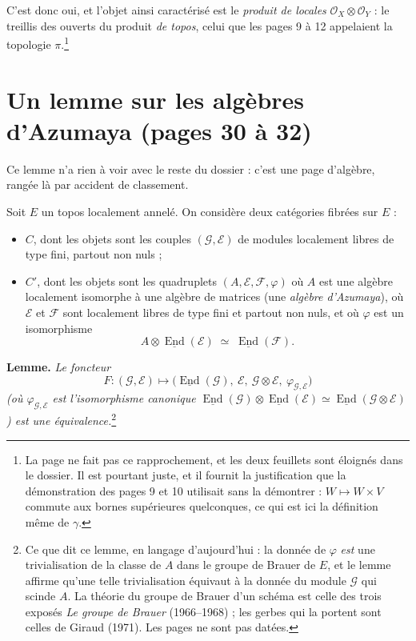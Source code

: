 \documentclass[11pt,a4paper]{article}
\begin{document}
C'est donc oui, et l'objet ainsi caractérisé est le \emph{produit de
locales} $\mathcal{O}_{X} \otimes \mathcal{O}_{Y}$ : le treillis des ouverts du
produit \emph{de topos}, celui que les pages 9 à 12 appelaient la topologie
$\pi$.\footnote{La page ne fait pas ce rapprochement, et les deux feuillets
sont éloignés dans le dossier. Il est pourtant juste, et il fournit la
justification que la démonstration des pages 9 et 10 utilisait sans la
démontrer : $W \mapsto W \times V$ commute aux bornes supérieures quelconques,
ce qui est ici la définition même de $\gamma$.}


\section*{Un lemme sur les algèbres d'Azumaya (pages 30 à 32)}

Ce lemme n'a rien à voir avec le reste du dossier : c'est une page d'algèbre,
rangée là par accident de classement.

Soit $E$ un topos localement annelé. On considère deux catégories fibrées sur
$E$ :

\begin{itemize}
\item $C$, dont les objets sont les couples $(\mathcal{G}, \mathcal{E})$ de
modules localement libres de type fini, partout non nuls ;
\item $C'$, dont les objets sont les quadruplets
$(A, \mathcal{E}, \mathcal{F}, \varphi)$ où $A$ est une algèbre localement
isomorphe à une algèbre de matrices (une \emph{algèbre d'Azumaya}), où
$\mathcal{E}$ et $\mathcal{F}$ sont localement libres de type fini et partout
non nuls, et où $\varphi$ est un isomorphisme
\[
A \otimes \underline{\operatorname{End}}(\mathcal{E}) \;\simeq\;
\underline{\operatorname{End}}(\mathcal{F}).
\]
\end{itemize}

\textbf{Lemme.} \emph{Le foncteur}
\[
F : (\mathcal{G}, \mathcal{E}) \longmapsto
\bigl(\underline{\operatorname{End}}(\mathcal{G}),\ \mathcal{E},\
\mathcal{G} \otimes \mathcal{E},\ \varphi_{\mathcal{G},\mathcal{E}}\bigr)
\]
\emph{(où $\varphi_{\mathcal{G},\mathcal{E}}$ est l'isomorphisme canonique
$\underline{\operatorname{End}}(\mathcal{G}) \otimes
\underline{\operatorname{End}}(\mathcal{E}) \simeq
\underline{\operatorname{End}}(\mathcal{G} \otimes \mathcal{E})$) est une
équivalence.}\footnote{Ce que dit ce lemme, en langage d'aujourd'hui : la
donnée de $\varphi$ \emph{est} une trivialisation de la classe de $A$ dans le
groupe de Brauer de $E$, et le lemme affirme qu'une telle trivialisation
équivaut à la donnée du module $\mathcal{G}$ qui scinde $A$. La théorie du groupe de Brauer d'un schéma est celle des trois
exposés \emph{Le groupe de Brauer} (1966--1968) ; les gerbes qui la portent
sont celles de Giraud (1971). Les pages ne sont pas datées.}
\end{document}
